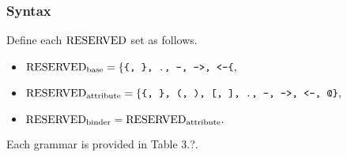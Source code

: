 \subsubsection*{Syntax}
Define each $\mathrm{RESERVED}$ set as follows. %
\begin{itemize}
\item $\mathrm{RESERVED}_{\textrm{base}} = \{\texttt{\{, \}, ., -, ->, <-\{},$
\item $\mathrm{RESERVED}_{\textrm{attribute}} = \{\texttt{\{, \}, (, ), [, ], ., -, ->, <-, @\}},$
\item $\mathrm{RESERVED}_{\textrm{binder}} = \mathrm{RESERVED}_{\textrm{attribute}}.$
\end{itemize}
Each grammar is provided in Table 3.?.


